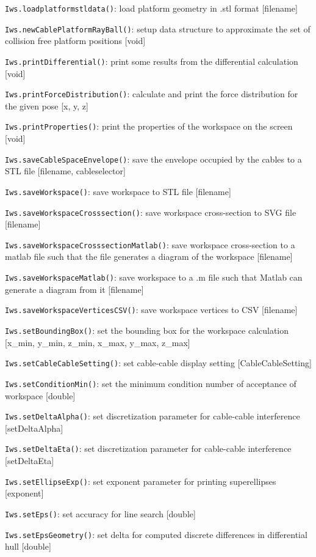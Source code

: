 \documentclass[11pt,a4paper,onepage,openany]{book}
\begin{document}
\texttt{Iws.loadplatformstldata()}: load platform geometry in .stl format [filename]

\texttt{Iws.newCablePlatformRayBall()}: setup data structure to approximate the set of collision free platform positions [void] 

\texttt{Iws.printDifferential()}: print some results from the differential calculation [void]

\texttt{Iws.printForceDistribution()}: calculate and print the force distribution for the given pose [x, y, z]

\texttt{Iws.printProperties()}: print the properties of the workspace on the screen [void]

\texttt{Iws.saveCableSpaceEnvelope()}: save the envelope occupied by the cables to a STL file [filename, cableselector]

\texttt{Iws.saveWorkspace()}: save workspace to STL file [filename]

\texttt{Iws.saveWorkspaceCrosssection()}: save workspace cross-section to SVG file [filename]

\texttt{Iws.saveWorkspaceCrosssectionMatlab()}: save workspace cross-section to a matlab file such that the file generates a diagram of the workspace [filename]

\texttt{Iws.saveWorkspaceMatlab()}: save workspace to a .m file such that Matlab can generate a diagram from it [filename]

\texttt{Iws.saveWorkspaceVerticesCSV()}: save workspace vertices to CSV [filename]

\texttt{Iws.setBoundingBox()}: set the bounding box for the workspace calculation [x\_min, y\_min, z\_min, x\_max, y\_max, z\_max]

\texttt{Iws.setCableCableSetting()}: set cable-cable display setting [CableCableSetting]

\texttt{Iws.setConditionMin()}: set the minimum condition number of acceptance of workspace [double]

\texttt{Iws.setDeltaAlpha()}: set discretization parameter for cable-cable interference [setDeltaAlpha]

\texttt{Iws.setDeltaEta()}: set discretization parameter for cable-cable interference [setDeltaEta]

\texttt{Iws.setEllipseExp()}: set exponent parameter for printing superellipses [exponent]

\texttt{Iws.setEps()}: set accuracy for line search [double]

\texttt{Iws.setEpsGeometry()}: set delta for computed discrete differences in differential hull [double]
\end{document}
